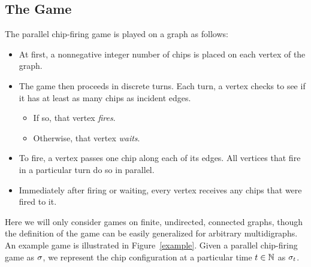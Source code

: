 \subsection*{The Game}
The parallel chip-firing game is played on a graph as follows:
\begin{itemize}
\item At first, a nonnegative integer number of chips is placed on each vertex
  of the graph.
\item The game then proceeds in discrete turns. Each turn, a vertex checks to
  see if it has at least as many chips as incident edges.
\begin{itemize}
\item If so, that vertex \emph{fires}.
\item Otherwise, that vertex \emph{waits}.
\end{itemize}
\item To fire, a vertex passes one chip along each of its edges. All vertices
  that fire in a particular turn do so in parallel.
\item Immediately after firing or waiting, every vertex receives any chips that
  were fired to it.
\end{itemize}
Here we will only consider games on finite, undirected, connected graphs,
though the definition of the game can be easily generalized for arbitrary
multidigraphs. An example game is illustrated in Figure~\ref{example}. Given a
parallel chip-firing game as $\sigma$, we represent the chip configuration at a
particular time $t \in \mathbb{N}$ as $\sigma_{t}$.

